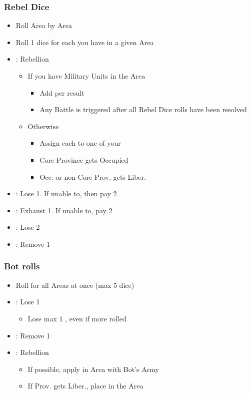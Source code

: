 \documentclass[10pt]{article}
\begin{document}
\subsubsection*{Rebel Dice}
\begin{itemize}
	\item Roll Area by Area
	\item Roll 1 dice for each \unrest you have in a given Area
	\item \rebellion: Rebellion
	\begin{itemize}
		\item If you have Military Units in the Area
		\begin{itemize}
			\item Add \rebels per \rebellion result
			\item Any Battle is triggered after all Rebel Dice rolls have been resolved
		\end{itemize}
		\item Otherwise
		\begin{itemize}
			\item Assign each \rebellion to one of your \unrest
			\item Core Province gets Occupied
			\item Occ. or non-Core Prov. gets Liber.
		\end{itemize}
	\end{itemize}
	\item \losemonarchpower: Lose 1\monarchpower. If unable to, then pay 2\ducats
	\item \exhaustunits: Exhaust 1\manpower. If unable to, pay 2\ducats
	\item \loseducats: Lose 2\ducats
	\item \removeunrest: Remove 1 \unrest
\end{itemize}

\subsubsection*{\botrules Bot rolls }
{\botrules
\begin{itemize}
	\item Roll for all Areas at once (max 5 dice)
	\item \loseducats \exhaustunits \losemonarchpower: Lose 1 \botpower
	\begin{itemize}
		\item Lose max 1 \botpower, even if more rolled
	\end{itemize}
	\item \removeunrest: Remove 1 \unrest
	\item \rebellion: Rebellion
	\begin{itemize}
		\item If possible, apply in Area with Bot's Army
		\item If Prov. gets Liber., place \claim in the Area
	\end{itemize}
\end{itemize}
}
\end{document}
